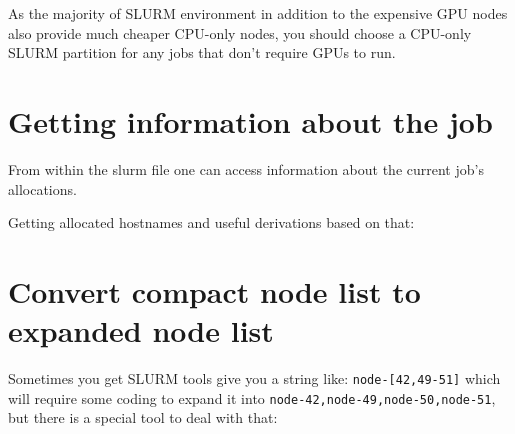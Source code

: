 \documentclass[
]{report}
\newenvironment{Shaded}{\begin{snugshade}}{\end{snugshade}}
\newcommand{\AttributeTok}[1]{\textcolor[rgb]{0.40,0.45,0.13}{#1}}
\newcommand{\BuiltInTok}[1]{\textcolor[rgb]{0.00,0.23,0.31}{#1}}
\newcommand{\ExtensionTok}[1]{\textcolor[rgb]{0.00,0.23,0.31}{#1}}
\newcommand{\FunctionTok}[1]{\textcolor[rgb]{0.28,0.35,0.67}{#1}}
\newcommand{\KeywordTok}[1]{\textcolor[rgb]{0.00,0.23,0.31}{#1}}
\newcommand{\NormalTok}[1]{\textcolor[rgb]{0.00,0.23,0.31}{#1}}
\newcommand{\OperatorTok}[1]{\textcolor[rgb]{0.37,0.37,0.37}{#1}}
\newcommand{\PreprocessorTok}[1]{\textcolor[rgb]{0.68,0.00,0.00}{#1}}
\newcommand{\SpecialStringTok}[1]{\textcolor[rgb]{0.13,0.47,0.30}{#1}}
\newcommand{\StringTok}[1]{\textcolor[rgb]{0.13,0.47,0.30}{#1}}
\newcommand{\VariableTok}[1]{\textcolor[rgb]{0.07,0.07,0.07}{#1}}
\begin{document}
As the majority of SLURM environment in addition to the expensive GPU
nodes also provide much cheaper CPU-only nodes, you should choose a
CPU-only SLURM partition for any jobs that don't require GPUs to run.

\section{Getting information about the
job}\label{getting-information-about-the-job}

From within the slurm file one can access information about the current
job's allocations.

Getting allocated hostnames and useful derivations based on that:

\begin{Shaded}
\end{Shaded}

\section{Convert compact node list to expanded node
list}\label{convert-compact-node-list-to-expanded-node-list}

Sometimes you get SLURM tools give you a string like:
\texttt{node-{[}42,49-51{]}} which will require some coding to expand it
into \texttt{node-42,node-49,node-50,node-51}, but there is a special
tool to deal with that:

\begin{Shaded}
\end{Shaded}
\end{document}
